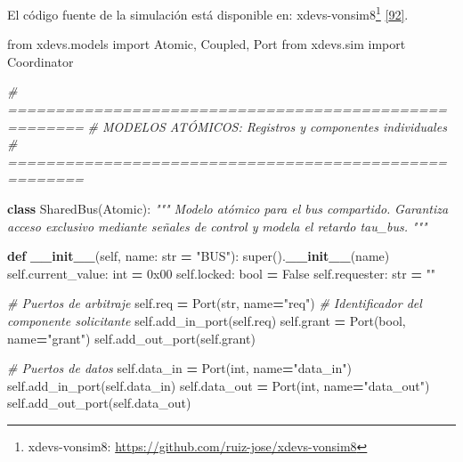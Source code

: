 \documentclass[12pt,oneside]{templates/unerthesis}
\newenvironment{Shaded}{\begin{snugshade}}{\end{snugshade}}
\newcommand{\BaseNTok}[1]{\textcolor[rgb]{0.00,0.00,0.81}{#1}}
\newcommand{\BuiltInTok}[1]{#1}
\newcommand{\CommentTok}[1]{\textcolor[rgb]{0.56,0.35,0.01}{\textit{#1}}}
\newcommand{\FunctionTok}[1]{\textcolor[rgb]{0.13,0.29,0.53}{\textbf{#1}}}
\newcommand{\ImportTok}[1]{#1}
\newcommand{\KeywordTok}[1]{\textcolor[rgb]{0.13,0.29,0.53}{\textbf{#1}}}
\newcommand{\NormalTok}[1]{#1}
\newcommand{\OperatorTok}[1]{\textcolor[rgb]{0.81,0.36,0.00}{\textbf{#1}}}
\newcommand{\StringTok}[1]{\textcolor[rgb]{0.31,0.60,0.02}{#1}}
\newcommand{\VariableTok}[1]{\textcolor[rgb]{0.00,0.00,0.00}{#1}}
\begin{document}
El código fuente de la simulación está disponible en:
xdevs-vonsim8\footnote{xdevs-vonsim8: \url{https://github.com/ruiz-jose/xdevs-vonsim8}} \protect\hyperlink{ref-ruiz2025-xdevsvonsim8}{{[}92{]}}.

\begin{Shaded}
\begin{Highlighting}[]
\ImportTok{from}\NormalTok{ xdevs.models }\ImportTok{import}\NormalTok{ Atomic, Coupled, Port}
\ImportTok{from}\NormalTok{ xdevs.sim }\ImportTok{import}\NormalTok{ Coordinator}


\CommentTok{\# ======================================================}
\CommentTok{\# MODELOS ATÓMICOS: Registros y componentes individuales}
\CommentTok{\# ======================================================}

\KeywordTok{class}\NormalTok{ SharedBus(Atomic):}
    \CommentTok{"""}
\CommentTok{    Modelo atómico para el bus compartido.}
\CommentTok{    Garantiza acceso exclusivo mediante señales de control y }
\CommentTok{    modela el retardo tau\_bus.}
\CommentTok{    """}
    
    \KeywordTok{def} \FunctionTok{\_\_init\_\_}\NormalTok{(}\VariableTok{self}\NormalTok{, name: }\BuiltInTok{str} \OperatorTok{=} \StringTok{"BUS"}\NormalTok{):}
        \BuiltInTok{super}\NormalTok{().}\FunctionTok{\_\_init\_\_}\NormalTok{(name)}
        \VariableTok{self}\NormalTok{.current\_value: }\BuiltInTok{int} \OperatorTok{=} \BaseNTok{0x00}
        \VariableTok{self}\NormalTok{.locked: }\BuiltInTok{bool} \OperatorTok{=} \VariableTok{False}
        \VariableTok{self}\NormalTok{.requester: }\BuiltInTok{str} \OperatorTok{=} \StringTok{""}
        
        \CommentTok{\# Puertos de arbitraje}
        \VariableTok{self}\NormalTok{.req }\OperatorTok{=}\NormalTok{ Port(}\BuiltInTok{str}\NormalTok{, name}\OperatorTok{=}\StringTok{"req"}\NormalTok{) }
        \CommentTok{\# Identificador del componente solicitante}
        \VariableTok{self}\NormalTok{.add\_in\_port(}\VariableTok{self}\NormalTok{.req)}
        \VariableTok{self}\NormalTok{.grant }\OperatorTok{=}\NormalTok{ Port(}\BuiltInTok{bool}\NormalTok{, name}\OperatorTok{=}\StringTok{"grant"}\NormalTok{)}
        \VariableTok{self}\NormalTok{.add\_out\_port(}\VariableTok{self}\NormalTok{.grant)}
        
        \CommentTok{\# Puertos de datos}
        \VariableTok{self}\NormalTok{.data\_in }\OperatorTok{=}\NormalTok{ Port(}\BuiltInTok{int}\NormalTok{, name}\OperatorTok{=}\StringTok{"data\_in"}\NormalTok{)}
        \VariableTok{self}\NormalTok{.add\_in\_port(}\VariableTok{self}\NormalTok{.data\_in)}
        \VariableTok{self}\NormalTok{.data\_out }\OperatorTok{=}\NormalTok{ Port(}\BuiltInTok{int}\NormalTok{, name}\OperatorTok{=}\StringTok{"data\_out"}\NormalTok{)}
        \VariableTok{self}\NormalTok{.add\_out\_port(}\VariableTok{self}\NormalTok{.data\_out)}
        

\end{Highlighting}
\end{Shaded}
\end{document}
